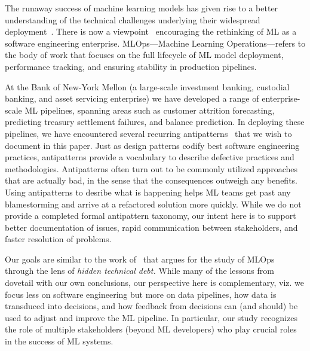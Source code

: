The runaway success of machine learning models has given rise to a better understanding of the technical challenges underlying their widespread deployment~\cite{paleyes2020challenges,sculley2015hidden}. There is now a
viewpoint~\cite{isbell2020} encouraging the rethinking of ML as a software
engineering enterprise.
MLOps---Machine Learning Operations---refers to the
body of work that focuses
on the full
lifecycle of ML model deployment, performance
tracking, and ensuring
stability in
production pipelines. 

At the Bank of New-York Mellon (a large-scale investment banking, custodial banking, and asset servicing enterprise) we have developed a range of enterprise-scale ML pipelines, spanning areas such as customer attrition forecasting, predicting
treasury settlement failures, and balance prediction. In deploying
these pipelines,
we have encountered several recurring antipatterns~\cite{antipatterns}
that we wish to document
in this paper.
Just as design patterns codify best software engineering practices, antipatterns provide a vocabulary to describe defective practices and methodologies.
Antipatterns often
turn out to be commonly utilized approaches that are actually bad,
in the sense that the consequences outweigh any benefits. Using antipatterns to desribe what is happening helps ML teams get past any blamestorming and arrive at a  refactored solution more quickly. While we do not provide a completed formal antipattern taxonomy,
our intent here is
to
support better documentation of issues, rapid communication
between stakeholders, and faster resolution of problems.

Our goals are similar to
the work of~\cite{sculley2015hidden} that argues for
the study of MLOps through
the lens of {\it hidden
technical debt.} While many of the lessons from~\cite{sculley2015hidden} dovetail with our
own conclusions, our
perspective here is
complementary, viz. we focus less on software engineering but more on data pipelines, how data is transduced into decisions, and how feedback from decisions can (and should) be
used to adjust and improve the ML pipeline.
In
particular, our study recognizes
the role of multiple
stakeholders (beyond ML
developers) who play crucial
roles in the success of
ML systems.

